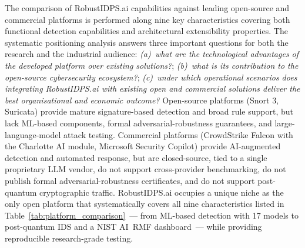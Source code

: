The comparison of \textsf{RobustIDPS.ai} capabilities against
leading open-source and commercial platforms is performed along
nine key characteristics covering both functional detection
capabilities and architectural extensibility properties. The
systematic positioning analysis answers three important questions
for both the research and the industrial audience: \emph{(a)~what
are the technological advantages of the developed platform over
existing solutions?}; \emph{(b)~what is its contribution to the
open-source cybersecurity ecosystem?}; \emph{(c)~under which
operational scenarios does integrating \textsf{RobustIDPS.ai}
with existing open and commercial solutions deliver the best
organisational and economic outcome?} Open-source platforms
(\textsf{Snort 3}, \textsf{Suricata}) provide mature
signature-based detection and broad rule support, but lack
ML-based components, formal adversarial-robustness guarantees,
and large-language-model attack testing. Commercial platforms
(\textsf{CrowdStrike Falcon} with the \textsf{Charlotte AI}
module, \textsf{Microsoft Security Copilot}) provide AI-augmented
detection and automated response, but are closed-source, tied to
a single proprietary LLM vendor, do not support cross-provider
benchmarking, do not publish formal adversarial-robustness
certificates, and do not support post-quantum cryptographic
traffic. \textsf{RobustIDPS.ai} occupies a unique niche as the
only open platform that systematically covers all nine
characteristics listed in
Table~\ref{tab:platform_comparison}~--- from ML-based detection
with 17 models to post-quantum IDS and a NIST AI~RMF
dashboard~--- while providing reproducible research-grade
testing.


